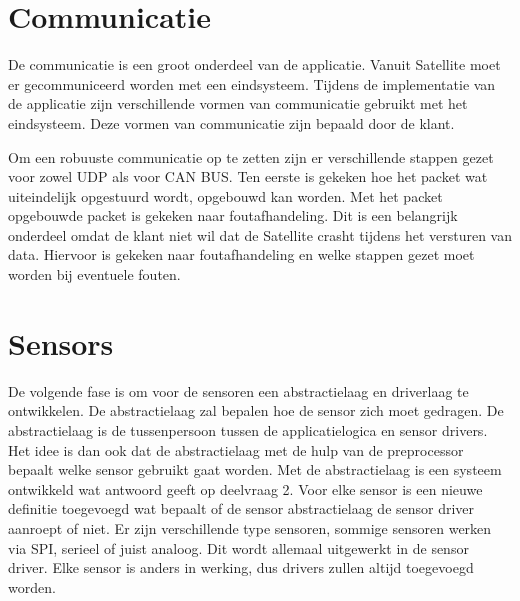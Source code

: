 \section{Communicatie}
De communicatie is een groot onderdeel van de applicatie. Vanuit Satellite moet er gecommuniceerd worden met een eindsysteem. Tijdens de implementatie van de applicatie zijn verschillende vormen van communicatie gebruikt met het eindsysteem. Deze vormen van communicatie zijn bepaald door de klant. \newline

\noindent Om een robuuste communicatie op te zetten zijn er verschillende stappen gezet voor zowel UDP als voor CAN BUS. Ten eerste is gekeken hoe het packet wat uiteindelijk opgestuurd wordt, opgebouwd kan worden. Met het packet opgebouwde packet is gekeken naar foutafhandeling. Dit is een belangrijk onderdeel omdat de klant niet wil dat de Satellite crasht tijdens het versturen van data. Hiervoor is gekeken naar foutafhandeling en welke stappen gezet moet worden bij eventuele fouten.


\section{Sensors}
De volgende fase is om voor de sensoren een abstractielaag en driverlaag te ontwikkelen. De abstractielaag zal bepalen hoe de sensor zich moet gedragen. De abstractielaag is de tussenpersoon tussen de applicatielogica en sensor drivers. Het idee is dan ook dat de abstractielaag met de hulp van de preprocessor bepaalt welke sensor gebruikt gaat worden. Met de abstractielaag is een systeem ontwikkeld wat antwoord geeft op deelvraag 2. Voor elke sensor is een nieuwe definitie toegevoegd wat bepaalt of de sensor abstractielaag de sensor driver aanroept of niet. Er zijn verschillende type sensoren, sommige sensoren werken via SPI, serieel of juist analoog. Dit wordt allemaal uitgewerkt in de sensor driver. Elke sensor is anders in werking, dus drivers zullen altijd toegevoegd worden.
